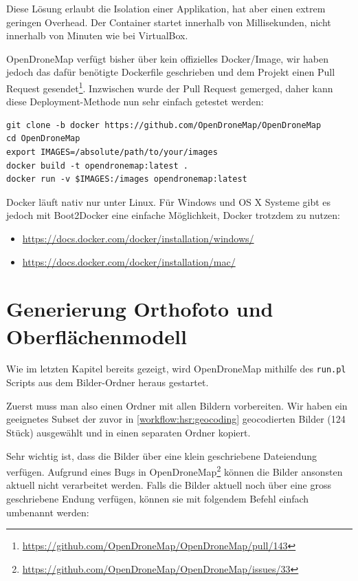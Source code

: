 Diese Lösung erlaubt die Isolation einer Applikation, hat aber einen extrem
geringen Overhead. Der Container startet innerhalb von Millisekunden, nicht
innerhalb von Minuten wie bei VirtualBox.

OpenDroneMap verfügt bisher über kein offizielles Docker\-/Image, wir haben
jedoch das dafür benötigte Dockerfile geschrieben und dem Projekt einen Pull
Request
gesendet\footnote{\url{https://github.com/OpenDroneMap/OpenDroneMap/pull/143}}.
Inzwischen wurde der Pull Request gemerged, daher kann diese Deployment-Methode
nun sehr einfach getestet werden:

\vspace{0.5\baselineskip}
\begin{verbatim} 
git clone -b docker https://github.com/OpenDroneMap/OpenDroneMap
cd OpenDroneMap
export IMAGES=/absolute/path/to/your/images
docker build -t opendronemap:latest .
docker run -v $IMAGES:/images opendronemap:latest
\end{verbatim}

Docker läuft nativ nur unter Linux. Für Windows und OS X Systeme gibt es jedoch
mit Boot2Docker eine einfache Möglichkeit, Docker trotzdem zu nutzen:

\begin{itemize}
	\item \url{https://docs.docker.com/docker/installation/windows/}
	\item \url{https://docs.docker.com/docker/installation/mac/}
\end{itemize}


\section{Generierung Orthofoto und Oberflächenmodell}

\label{workflow:hsr:generate}

Wie im letzten Kapitel bereits gezeigt, wird OpenDroneMap mithilfe des
\texttt{run.pl} Scripts aus dem Bilder-Ordner heraus gestartet.

Zuerst muss man also einen Ordner mit allen Bildern vorbereiten. Wir haben ein
geeignetes Subset der zuvor in \autoref{workflow:hsr:geocoding} geocodierten
Bilder (124 Stück) ausgewählt und in einen separaten Ordner kopiert.

Sehr wichtig ist, dass die Bilder über eine klein geschriebene Dateiendung
verfügen. Aufgrund eines Bugs in
OpenDroneMap\footnote{\url{https://github.com/OpenDroneMap/OpenDroneMap/issues/33}}
können die Bilder ansonsten aktuell nicht verarbeitet werden. Falls die Bilder
aktuell noch über eine gross geschriebene Endung verfügen, können sie mit
folgendem Befehl einfach umbenannt werden:


